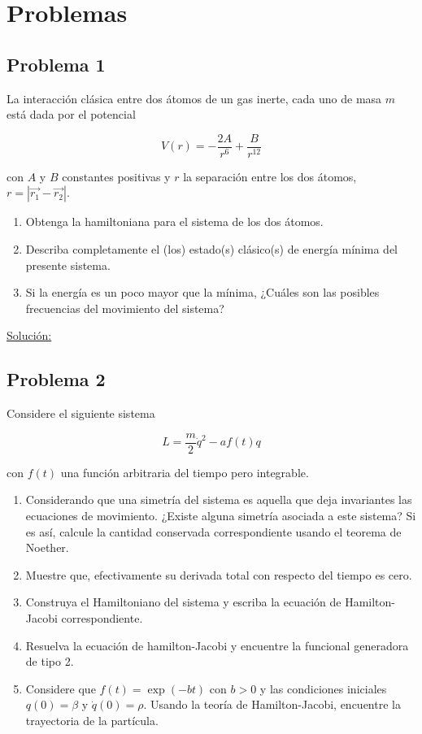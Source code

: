 \documentclass[a4paper,10pt]{article}
\numberwithin{equation}{section}
\begin{document}
\section{Problemas}

\subsection{Problema 1}

La interacción clásica entre dos átomos de un gas inerte, cada uno de masa $m$ está dada por el
potencial 

$$
V(r) = - \frac{2A}{r^6} + \frac{B}{r^{12}}
$$

con $A$ y $B$ constantes positivas y $r$ la separación entre los dos átomos, $r = |\overrightarrow{r_1} 
- \overrightarrow{r_2}|$.

\begin{enumerate}[label=\alph*)]
 \item Obtenga la hamiltoniana para el sistema de los dos átomos.
 \item Describa completamente el (los) estado(s) clásico(s) de energía mínima del presente 
 sistema.
 \item Si la energía es un poco mayor que la mínima, ¿Cuáles son las posibles frecuencias 
 del movimiento del sistema?
\end{enumerate}

\vspace{.3cm}

\underline{Solución:} \vspace{.3cm}

\subsection{Problema 2}

Considere el siguiente sistema 

$$
L = \frac{m}{2}\dot{q}^2 - af(t)q
$$

con $f(t)$ una función arbitraria del tiempo pero integrable.

\begin{enumerate}[label=\alph*)]
 \item Considerando que una simetría del sistema es aquella que deja invariantes las 
 ecuaciones de movimiento. ¿Existe alguna simetría asociada a este sistema? Si es así,
 calcule la cantidad conservada correspondiente usando el teorema de Noether.
 \item Muestre que, efectivamente su derivada total con respecto del tiempo es cero.
 \item Construya el Hamiltoniano del sistema y escriba la ecuación de Hamilton-Jacobi 
 correspondiente.
 \item Resuelva la ecuación de hamilton-Jacobi y encuentre la funcional generadora de 
 tipo 2.
 \item Considere que $f(t) = \exp{(-bt)}$ con $b > 0$ y las condiciones iniciales
 $q(0) = \beta$ y $\dot{q}(0) = \rho$. Usando la teoría de Hamilton-Jacobi, encuentre 
 la trayectoria de la partícula.
\end{enumerate}
\end{document}
